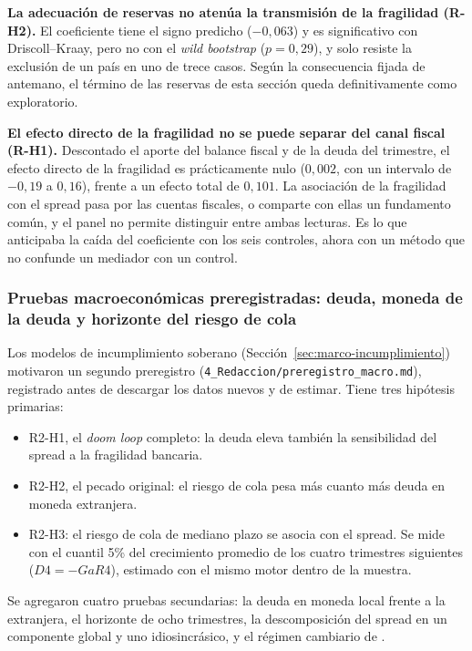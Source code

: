 \textbf{La adecuación de reservas no atenúa la transmisión de la fragilidad (R-H2).} El coeficiente tiene el signo predicho ($-0{,}063$) y es significativo con Driscoll--Kraay, pero no con el \textit{wild bootstrap} ($p=0{,}29$), y solo resiste la exclusión de un país en uno de trece casos. Según la consecuencia fijada de antemano, el término de las reservas de esta sección queda definitivamente como exploratorio.

\textbf{El efecto directo de la fragilidad no se puede separar del canal fiscal (R-H1).} Descontado el aporte del balance fiscal y de la deuda del trimestre, el efecto directo de la fragilidad es prácticamente nulo ($0{,}002$, con un intervalo de $-0{,}19$ a $0{,}16$), frente a un efecto total de $0{,}101$. La asociación de la fragilidad con el spread pasa por las cuentas fiscales, o comparte con ellas un fundamento común, y el panel no permite distinguir entre ambas lecturas. Es lo que anticipaba la caída del coeficiente con los seis controles, ahora con un método que no confunde un mediador con un control.

\subsubsection{Pruebas macroeconómicas preregistradas: deuda, moneda de la deuda y horizonte del riesgo de cola}
\label{sec:macro-prereg}

Los modelos de incumplimiento soberano (Sección~\ref{sec:marco-incumplimiento}) motivaron un segundo preregistro (\texttt{4\_Redaccion/preregistro\_macro.md}), registrado antes de descargar los datos nuevos y de estimar. Tiene tres hipótesis primarias:
\begin{itemize}
    \item R2-H1, el \textit{doom loop} completo: la deuda eleva también la sensibilidad del spread a la fragilidad bancaria.
    \item R2-H2, el pecado original: el riesgo de cola pesa más cuanto más deuda en moneda extranjera.
    \item R2-H3: el riesgo de cola de mediano plazo se asocia con el spread. Se mide con el cuantil 5\% del crecimiento promedio de los cuatro trimestres siguientes ($D4=-GaR4$), estimado con el mismo motor dentro de la muestra.
\end{itemize}
Se agregaron cuatro pruebas secundarias: la deuda en moneda local frente a la extranjera, el horizonte de ocho trimestres, la descomposición del spread en un componente global y uno idiosincrásico, y el régimen cambiario de \citet{IlzetzkiReinhartRogoff2019}.

